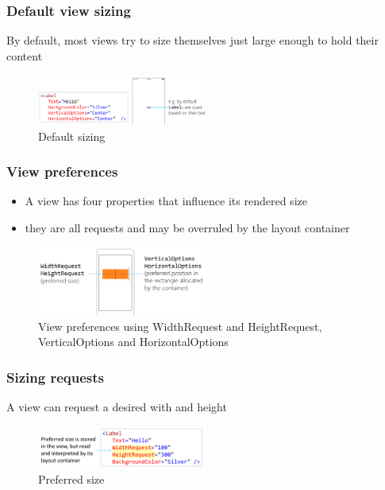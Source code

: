 \documentclass{article}
\begin{document}
\subsubsection{Default view sizing}

By default, most views try to size themselves just large enough to hold their content

\begin{figure}[H]
    \centering
    \includegraphics[width=0.5\textwidth]{xaml-default.png}
    \caption{Default sizing}
\end{figure}

\subsubsection{View preferences}

\begin{itemize}
    \item A view has four properties that influence its rendered size
    \item they are all requests and may be overruled by the layout container
\end{itemize}

\begin{figure}[H]
    \centering
    \includegraphics[width=0.5\textwidth]{xaml-view-preferences.png}
    \caption{View preferences using WidthRequest and HeightRequest, VerticalOptions and HorizontalOptions}
\end{figure}

\subsubsection{Sizing requests}

A view can request a desired with and height

\begin{figure}[H]
    \centering
    \includegraphics[width=0.5\textwidth]{xaml-sizing-requests.png}
    \caption{Preferred size}
\end{figure}
\end{document}
